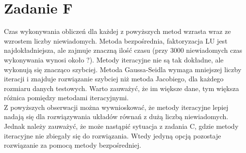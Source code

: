 \documentclass{article} %
\begin{document}
\section{Zadanie F}
Czas wykonywania obliczeń dla każdej z powyższych metod wzrasta wraz ze wzrostem liczby niewiadomych. Metoda bezpośrednia, faktoryzacja LU jest najdokładniejsza, ale zajmuje znaczną ilość czasu (przy 3000 niewiadomych czas wykonywania wynosi około ?). Metody iteracyjne nie są tak dokładne, ale wykonują się znacząco szybciej. Metoda Gaussa-Seidla wymaga mniejszej liczby iteracji i znajduje rozwiązanie szybciej niż metoda Jacobiego, dla każdego rozmiaru danych testowych. Warto zauważyć, że im większe dane, tym większa różnica pomiędzy metodami iteracyjnymi. \\
Z powyższych obserwacji można wywnioskować, że metody iteracyjne lepiej nadają się dla rozwiązywania układów równań z dużą liczbą niewiadomych. Jednak należy zauważyć, że może nastąpić sytuacja z zadania C, gdzie metody iteracyjne nie zbiegały się do rozwiązania. Wtedy jedyną opcją pozostaje rozwiązanie za pomocą metody bezpośredniej.
\end{document}
